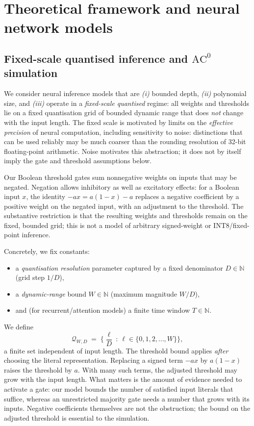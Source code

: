 \documentclass[twoside,11pt]{article}
\newcommand{\AC}{\mathrm{AC}}
\newcommand{\N}{\mathbb{N}}
\newcommand{\Qset}{\mathcal{Q}}
\numberwithin{theorem}{section}
\numberwithin{equation}{section}
\begin{document}
\section{Theoretical framework and neural network models}
\label{sec:framework}

\subsection{Fixed-scale quantised inference and \texorpdfstring{$\AC^0$}{AC0} simulation}
\label{sec:framework-fixedprecision}

We consider neural inference models that are \emph{(i)} bounded depth, \emph{(ii)} polynomial size, and \emph{(iii)} operate in a \emph{fixed-scale quantised} regime:
all weights and thresholds lie on a fixed quantisation grid of bounded dynamic range that does \emph{not} change with the input length.
The fixed scale is motivated by limits on the \emph{effective precision} of neural computation, including sensitivity to noise: distinctions that can be used reliably may be much coarser than the rounding resolution of 32-bit floating-point arithmetic. Noise motivates this abstraction; it does not by itself imply the gate and threshold assumptions below.

Our Boolean threshold gates sum nonnegative weights on inputs that may be negated. Negation allows inhibitory as well as excitatory effects: for a Boolean input $x$, the identity $-ax=a(1-x)-a$ replaces a negative coefficient by a positive weight on the negated input, with an adjustment to the threshold. The substantive restriction is that the resulting weights and thresholds remain on the fixed, bounded grid; this is not a model of arbitrary signed-weight or INT8/fixed-point inference.

Concretely, we fix constants:
\begin{itemize}[leftmargin=*]
\item a \emph{quantisation resolution} parameter captured by a fixed denominator $D\in\N$ (grid step $1/D$),
\item a \emph{dynamic-range} bound $W\in\N$ (maximum magnitude $W/D$),
\item and (for recurrent/attention models) a finite time window $T\in\N$.
\end{itemize}
We define
\[
\Qset_{W,D} \;=\; \Big\{ \frac{\ell}{D}\ :\ \ell\in\{0,1,2,\dots,W\}\Big\},
\]
a finite set independent of input length.
The threshold bound applies \emph{after} choosing the literal representation. Replacing a signed term $-a x$ by $a(1-x)$ raises the threshold by $a$. With many such terms, the adjusted threshold may grow with the input length. What matters is the amount of evidence needed to activate a gate: our model bounds the number of satisfied input literals that suffice, whereas an unrestricted majority gate needs a number that grows with its inputs. Negative coefficients themselves are not the obstruction; the bound on the adjusted threshold is essential to the simulation.
\end{document}
